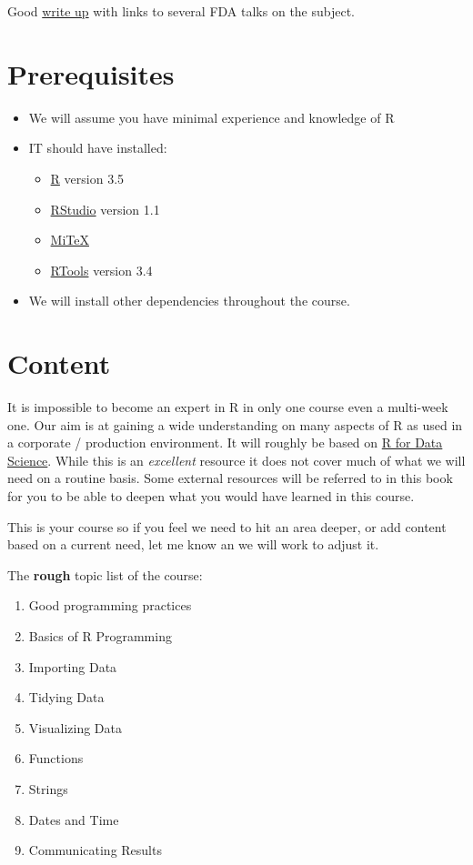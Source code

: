 \documentclass[]{book}
\providecommand{\tightlist}{%
  \setlength{\itemsep}{0pt}\setlength{\parskip}{0pt}}
\theoremstyle{definition}
\theoremstyle{definition}
\theoremstyle{definition}
\theoremstyle{remark}
\begin{document}
Good \href{http://blog.revolutionanalytics.com/2017/06/r-fda.html}{write
up} with links to several FDA talks on the subject.

\section{Prerequisites}\label{prerequisites}

\begin{itemize}
\tightlist
\item
  We will assume you have minimal experience and knowledge of R
\item
  IT should have installed:

  \begin{itemize}
  \tightlist
  \item
    \href{https://cran.r-project.org/}{R} version 3.5
  \item
    \href{https://www.rstudio.com/products/rstudio/download/\#download}{RStudio}
    version 1.1
  \item
    \href{https://miktex.org/}{MiTeX}
  \item
    \href{https://cran.r-project.org/bin/windows/Rtools/}{RTools}
    version 3.4
  \end{itemize}
\item
  We will install other dependencies throughout the course.
\end{itemize}

\section{Content}\label{content}

It is impossible to become an expert in R in only one course even a
multi-week one. Our aim is at gaining a wide understanding on many
aspects of R as used in a corporate / production environment. It will
roughly be based on \href{http://r4ds.had.co.nz}{R for Data Science}.
While this is an \emph{excellent} resource it does not cover much of
what we will need on a routine basis. Some external resources will be
referred to in this book for you to be able to deepen what you would
have learned in this course.

This is your course so if you feel we need to hit an area deeper, or add
content based on a current need, let me know an we will work to adjust
it.

The \textbf{rough} topic list of the course:

\begin{enumerate}
\def\labelenumi{\arabic{enumi}.}
\tightlist
\item
  Good programming practices
\item
  Basics of R Programming
\item
  Importing Data
\item
  Tidying Data
\item
  Visualizing Data
\item
  Functions
\item
  Strings
\item
  Dates and Time
\item
  Communicating Results
\end{enumerate}
\end{document}
